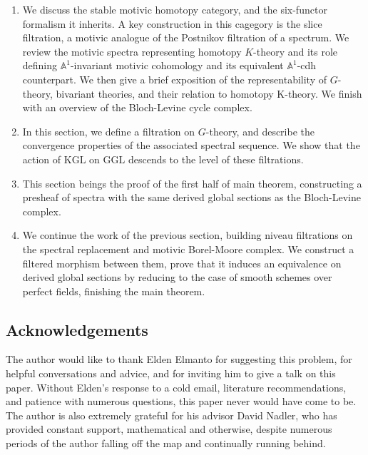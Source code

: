 \documentclass[11pt, twoside]{article}
\numberwithin{equation}{section}
\theoremstyle{definition}
\newcommand{\bb}[1]{\mathbb{#1}}
\newcommand{\Kgl}{\mathrm{KGL}}
\newcommand{\Ggl}{\mathrm{GGL}}
\begin{document}
\begin{enumerate}
\item[\S\ref{prelim}] We discuss the stable motivic homotopy category, and the six-functor formalism it inherits. A key construction in this cagegory is the slice filtration, a motivic analogue of the Postnikov filtration of a spectrum. We review the motivic spectra representing homotopy \(K\)-theory and its role defining \(\bb{A}^1\)-invariant motivic cohomology and its equivalent \(\bb{A}^1\)-cdh counterpart. We then give a brief exposition of the representability of \(G\)-theory, bivariant theories, and their relation to homotopy K-theory. We finish with an overview of the Bloch-Levine cycle complex.

\item[\S\ref{G-fil}] In this section, we define a filtration on \(G\)-theory, and describe the convergence properties of the associated spectral sequence. We show that the action of \(\Kgl\) on \(\Ggl\) descends to the level of these filtrations.

\item[\S\ref{slice-comp-A}] This section beings the proof of the first half of main theorem, constructing a presheaf of spectra with the same derived global sections as the Bloch-Levine complex.

\item[\S\ref{slice-comp-B}] We continue the work of the previous section, building niveau filtrations on the spectral replacement and motivic Borel-Moore complex. We construct a filtered morphism between them, prove that it induces an equivalence on derived global sections by reducing to the case of smooth schemes over perfect fields, finishing the main theorem.

\end{enumerate}

\subsection{Acknowledgements}
The author would like to thank Elden Elmanto for suggesting this problem, for helpful conversations and advice, and for inviting him to give a talk on this paper. Without Elden's response to a cold email, literature recommendations, and patience with numerous questions, this paper never would have come to be. The author is also extremely grateful for his advisor David Nadler, who has provided constant support, mathematical and otherwise, despite numerous periods of the author falling off the map and continually running behind.
\end{document}

